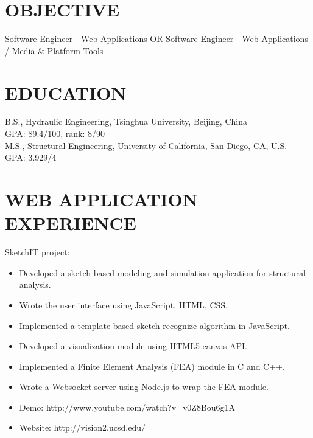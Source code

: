 \documentclass[margin,11pt]{res}
\begin{document}

\address{{\bf Address} \\  8870 Villa La Jolla Drive  \\ La Jolla, CA 92037 \\ (858) 888-2583}
\address{ {\bf Email:} geli19880206@gmail.com \\ {\bf Website:} lige.me \\ {\bf Github:} lge88}


\begin{resume}

  \section{OBJECTIVE}
  Software Engineer - Web Applications OR
  Software Engineer - Web Applications / Media \& Platform Tools

  \section{EDUCATION}
  B.S., Hydraulic Engineering, Tsinghua University, Beijing, China \\
  GPA: 89.4/100, rank: 8/90 \\
  M.S., Structural Engineering, University of California, San Diego, CA, U.S. \\
  GPA: 3.929/4

  \section{WEB APPLICATION EXPERIENCE}
  SketchIT project:
  \begin{itemize}
  \item[] Developed a sketch-based modeling and simulation application for structural analysis.
  \item[] Wrote the user interface using JavaScript, HTML, CSS.
  \item[] Implemented a template-based sketch recognize algorithm in JavaScript.
  \item[] Developed a visualization module using HTML5 canvas API.
  \item[] Implemented a Finite Element Analysis (FEA) module in C and C++.
  \item[] Wrote a Websocket server using Node.js to wrap the FEA module.
  \item[] Demo: http://www.youtube.com/watch?v=v0Z8Bou6g1A
  \item[] Website: http://vision2.ucsd.edu/
  \end{itemize}


\end{resume}
\end{document}
